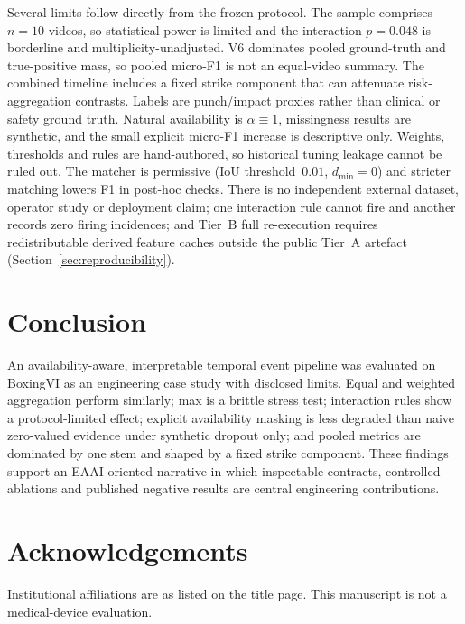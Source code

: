 \documentclass[preprint,12pt,numbers,sort&compress]{elsarticle}
\begin{document}
Several limits follow directly from the frozen protocol.
The sample comprises $n{=}10$ videos, so statistical power is limited and the interaction $p{=}0.048$ is borderline and multiplicity-unadjusted.
V6 dominates pooled ground-truth and true-positive mass, so pooled micro-F1 is not an equal-video summary.
The combined timeline includes a fixed strike component that can attenuate risk-aggregation contrasts.
Labels are punch/impact proxies rather than clinical or safety ground truth.
Natural availability is $\alpha{\equiv}1$, missingness results are synthetic, and the small explicit micro-F1 increase is descriptive only.
Weights, thresholds and rules are hand-authored, so historical tuning leakage cannot be ruled out.
The matcher is permissive (IoU threshold~$0.01$, $d_{\min}{=}0$) and stricter matching lowers F1 in post-hoc checks.
There is no independent external dataset, operator study or deployment claim; one interaction rule cannot fire and another records zero firing incidences; and Tier~B full re-execution requires redistributable derived feature caches outside the public Tier~A artefact (Section~\ref{sec:reproducibility}).

\section{Conclusion}
\label{sec:conclusion}

An availability-aware, interpretable temporal event pipeline was evaluated on BoxingVI as an engineering case study with disclosed limits.
Equal and weighted aggregation perform similarly; max is a brittle stress test; interaction rules show a protocol-limited effect; explicit availability masking is less degraded than naive zero-valued evidence under synthetic dropout only; and pooled metrics are dominated by one stem and shaped by a fixed strike component.
These findings support an EAAI-oriented narrative in which inspectable contracts, controlled ablations and published negative results are central engineering contributions.

\section*{Acknowledgements}
Institutional affiliations are as listed on the title page.
This manuscript is not a medical-device evaluation.
\end{document}
